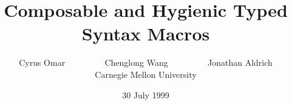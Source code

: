 \documentclass{sig-alternate}
\begin{document}
%

\title{Composable and Hygienic Typed Syntax Macros}
%
%
%
%
%

%
\author{
%
%
\alignauthor
Cyrus Omar ~~~~~~~~ Chenglong Wang ~~~~~~~~ Jonathan Aldrich \\ Carnegie Mellon University \\ 
}

\date{30 July 1999}
\end{document}
